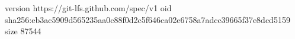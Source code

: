 version https://git-lfs.github.com/spec/v1
oid sha256:eb3ac5909d565235aa0c88f0d2c5f646ca02e6758a7adcc39665f37e8dcd5159
size 87544
